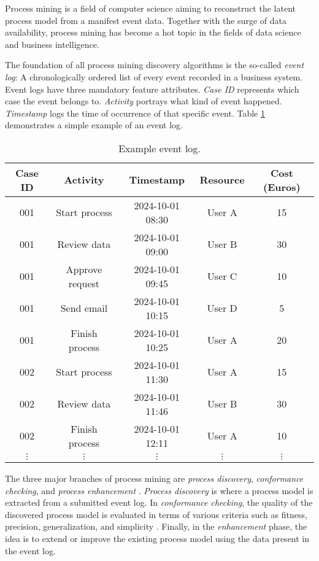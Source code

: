 
Process mining \cite{bible} is a field of computer science aiming to reconstruct the latent process model from a manifest event data. Together with the surge of data availability, process mining has become a hot topic in the fields of data science and business intelligence. 

The foundation of all process mining discovery algorithms is the so-called \emph{event log}: A chronologically ordered list of every event recorded in a business system. Event logs have three mandatory feature attributes. \emph{Case ID} represents which case the event belongs to. \emph{Activity} portrays what kind of event happened. \emph{Timestamp} logs the time of occurrence of that specific event. Table \ref{tab:example_event_log} demonstrates a simple example of an event log.

\renewcommand{\arraystretch}{1.25}
\begin{table}[h]
    \centering
	\caption{Example event log.}
    \begin{tabular}{|c|c|c|c|c|}
        \hline
        \textbf{Case ID} & \textbf{Activity} & \textbf{Timestamp} & \textbf{Resource} & \textbf{Cost (Euros)} \\ 
        \hline
        001 & Start process  & 2024-10-01 08:30 & User A & 15 \\ 
        001 & Review data    & 2024-10-01 09:00 & User B & 30 \\ 
        001 & Approve request & 2024-10-01 09:45 & User C & 10 \\ 
        001 & Send email     & 2024-10-01 10:15 & User D & 5  \\ 
        001 & Finish process & 2024-10-01 10:25 & User A & 20 \\
		002 & Start process  & 2024-10-01 11:30 & User A & 15 \\ 
        002 & Review data    & 2024-10-01 11:46 & User B & 30 \\ 
        002 & Finish process & 2024-10-01 12:11 & User A & 10 \\ 
		$\vdots$ & $\vdots$ & $\vdots$ & $\vdots$ & $\vdots$ \\
        \hline
    \end{tabular}
    \label{tab:example_event_log}
\end{table}

The three major branches of process mining are \emph{process discovery}, \emph{conformance checking}, and \emph{process enhancement} \cite{bible}. \emph{Process discovery} is where a process model is extracted from a submitted event log. In \emph{conformance checking}, the quality of the discovered process model is evaluated in terms of various criteria such as fitness, precision, generalization, and simplicity \cite{conformance-checking}. Finally, in the \emph{enhancement} phase, the idea is to extend or improve the existing process model using the data present in the event log.


